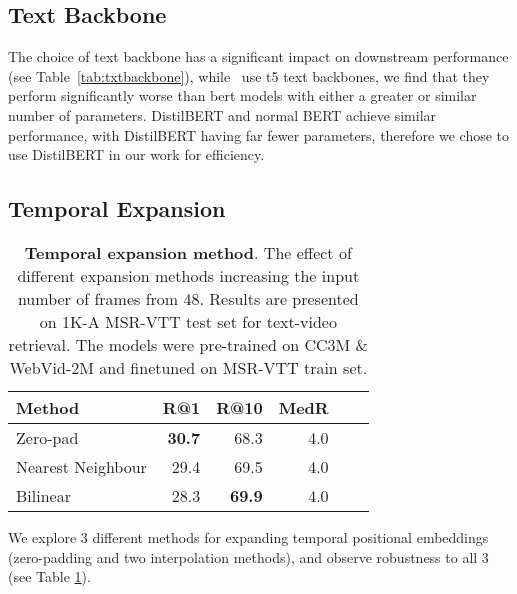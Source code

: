 \documentclass[10pt,twocolumn,letterpaper]{article}
\begin{document}
\subsection{Text Backbone}
The choice of text backbone has a significant impact on downstream performance (see Table~\ref{tab:txtbackbone}), while~\cite{patrick2020support} use t5 text backbones, we find that they perform significantly worse than bert models with either a greater or similar number of parameters. DistilBERT and normal BERT achieve similar performance, with DistilBERT having far fewer parameters, therefore we chose to use DistilBERT in our work for efficiency.
\begin{table}\centering
\caption{\textbf{Text backbone.} Text-to-video retrieval results on MSR-VTT test set with different text backbones. All models were pretrained on WebVid-2M and finetuned on MSR-VTT train set. The video backbone is fixed to the base space-time transformer with an input resolution of 224 and a patch size .}
\label{tab:txtbackbone}
\end{table} 
\subsection{Temporal Expansion}
\label{sec:temp_expansion}
\begin{table}[ht]
\centering
\caption{\textbf{Temporal expansion method}. The effect of different expansion methods increasing the input number of frames from 48. Results are presented on 1K-A MSR-VTT test set for text-video retrieval. The models were pre-trained on CC3M \& WebVid-2M and finetuned on MSR-VTT train set.}
\begin{tabular}{lrrrrr}
\toprule
\textbf{Method} & \textbf{R@1} & \textbf{R@10} & \textbf{MedR}    \\
\midrule
Zero-pad           & \textbf{30.7}       & 68.3      & 4.0   \\
Nearest Neighbour            & 29.4       & 69.5      & 4.0   \\
Bilinear           & 28.3    & \textbf{69.9}      & 4.0 \\
\bottomrule
\end{tabular}
\label{tab:temporalexp}
\end{table} We explore 3 different methods for expanding temporal positional embeddings (zero-padding and two interpolation methods), and observe robustness to all 3 (see Table \ref{tab:temporalexp}).
\end{document}
